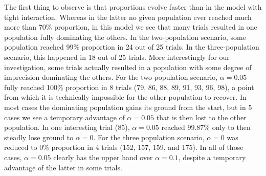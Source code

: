 \documentclass[a4paper]{article}
\begin{document}
The first thing to observe is that proportions evolve faster than in the model with tight interaction.
Whereas in the latter no given population ever reached much more than 70\% proportion, in this model we see that many trials resulted in one population fully dominating the others.
In the two-population scenario, some population reached 99\% proportion in 24 out of 25 trials.
In the three-population scenario, this happened in 18 out of 25 trials.
More interestingly for our investigation, some trials actually resulted in a population with some degree of imprecision dominating the others.
For the two-population scenario, $\alpha = 0.05$ fully reached 100\% proportion in 8 trials (79, 86, 88, 89, 91, 93, 96, 98), a point from which it is technically impossible for the other population to recover.
In most cases the dominating population gains its ground from the start, but in 5 cases we see a temporary advantage of $\alpha = 0.05$ that is then lost to the other population.
In one interesting trial (85), $\alpha = 0.05$ reached 99.87\% only to then steadly lose ground to $\alpha = 0$.
For the three population scenario, $\alpha = 0$ was reduced to 0\% proportion in 4 trials (152, 157, 159, and 175).
In all of those cases, $\alpha = 0.05$ clearly has the upper hand over $\alpha = 0.1$, despite a temporary advantage of the latter in some trials.
\end{document}

